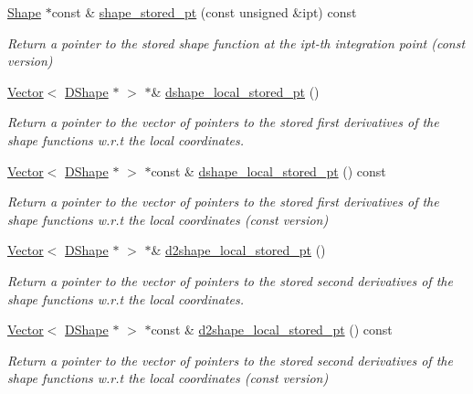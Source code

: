 \begin{DoxyCompactItemize}
\hyperlink{classoomph_1_1Shape}{Shape} $\ast$const  \& \hyperlink{classoomph_1_1StorableShapeElementBase_a018c7e8eadda6f88001ae21f86d0c6ab}{shape\+\_\+stored\+\_\+pt} (const unsigned \&ipt) const
\begin{DoxyCompactList}\small\item\em Return a pointer to the stored shape function at the ipt-\/th integration point (const version) \end{DoxyCompactList}\item 
\hyperlink{classoomph_1_1Vector}{Vector}$<$ \hyperlink{classoomph_1_1DShape}{D\+Shape} $\ast$ $>$ $\ast$\& \hyperlink{classoomph_1_1StorableShapeElementBase_a90f64349a5a609ddc42cf6bd15754282}{dshape\+\_\+local\+\_\+stored\+\_\+pt} ()
\begin{DoxyCompactList}\small\item\em Return a pointer to the vector of pointers to the stored first derivatives of the shape functions w.\+r.\+t the local coordinates. \end{DoxyCompactList}\item 
\hyperlink{classoomph_1_1Vector}{Vector}$<$ \hyperlink{classoomph_1_1DShape}{D\+Shape} $\ast$ $>$ $\ast$const  \& \hyperlink{classoomph_1_1StorableShapeElementBase_aeda3b465ee4fb0af2f55dffa53046cc9}{dshape\+\_\+local\+\_\+stored\+\_\+pt} () const
\begin{DoxyCompactList}\small\item\em Return a pointer to the vector of pointers to the stored first derivatives of the shape functions w.\+r.\+t the local coordinates (const version) \end{DoxyCompactList}\item 
\hyperlink{classoomph_1_1Vector}{Vector}$<$ \hyperlink{classoomph_1_1DShape}{D\+Shape} $\ast$ $>$ $\ast$\& \hyperlink{classoomph_1_1StorableShapeElementBase_a49fd0060048f85f20f5d05a89323fb07}{d2shape\+\_\+local\+\_\+stored\+\_\+pt} ()
\begin{DoxyCompactList}\small\item\em Return a pointer to the vector of pointers to the stored second derivatives of the shape functions w.\+r.\+t the local coordinates. \end{DoxyCompactList}\item 
\hyperlink{classoomph_1_1Vector}{Vector}$<$ \hyperlink{classoomph_1_1DShape}{D\+Shape} $\ast$ $>$ $\ast$const  \& \hyperlink{classoomph_1_1StorableShapeElementBase_abb20c7f9b53bd4b5347bd9d37e7f3b63}{d2shape\+\_\+local\+\_\+stored\+\_\+pt} () const
\begin{DoxyCompactList}\small\item\em Return a pointer to the vector of pointers to the stored second derivatives of the shape functions w.\+r.\+t the local coordinates (const version) \end{DoxyCompactList}\item 

\end{DoxyCompactItemize}
